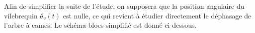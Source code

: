 \documentclass[10pt,fleqn]{article} %
\begin{document}
\begin{multicols}{2}
% 
%
%
%
%
%
%
%
%
%
%
%
%
%
%
%



 Afin de simplifier la suite de l'étude, on supposera que la position angulaire du vilebrequin $\theta_{v}(t)$ est nulle, ce qui revient à étudier directement le déphasage de l'arbre à cames. Le schéma-blocs simplifié est donné ci-dessous.%




\end{multicols}
\end{document}
